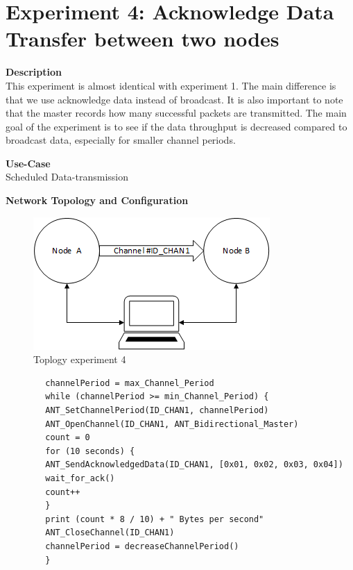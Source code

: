 \section{Experiment 4: Acknowledge Data Transfer between two nodes}
\begin{description} 
	\item{\textbf{Description}} \hfill \\ This experiment is almost identical with experiment 1. The main difference is that we use acknowledge data instead of broadcast. It is also important to note that the master records how many successful packets are transmitted. The main goal of the experiment is to see if the data throughput is decreased compared to broadcast data, especially for smaller channel periods.
	\item{\textbf{Use-Case}} \hfill \\ Scheduled Data-transmission
	\item{\textbf{Network Topology and Configuration}} \hfill \\
	\begin{figure}[H]
		\centering
		\includegraphics[scale=1]{content/images/exp_topo.png}
		\caption{Toplogy experiment 4}
	\end{figure}
	\begin{code}[H]
		\begin{verbatim}
		channelPeriod = max_Channel_Period
		while (channelPeriod >= min_Channel_Period) {
		ANT_SetChannelPeriod(ID_CHAN1, channelPeriod)
		ANT_OpenChannel(ID_CHAN1, ANT_Bidirectional_Master)
		count = 0
		for (10 seconds) {
		ANT_SendAcknowledgedData(ID_CHAN1, [0x01, 0x02, 0x03, 0x04])	   
		wait_for_ack()
		count++
		}
		print (count * 8 / 10) + " Bytes per second"	  
		ANT_CloseChannel(ID_CHAN1)
		channelPeriod = decreaseChannelPeriod()
		} 
		\end{verbatim}
		\caption{Acknowledge data transfer (Master)}\label{lst:mExp4}
	\end{code}
	

\end{description}
